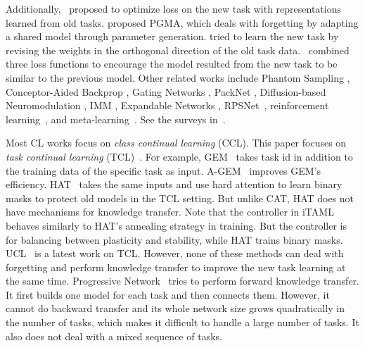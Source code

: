 \documentclass{article}
\begin{document}
Additionally,~\cite{Rosenfeld2017incremental} proposed to optimize loss on the new task with representations learned from old tasks. \cite{hu2019overcoming} proposed PGMA, which deals with forgetting by adapting a shared model through parameter generation.  
\cite{zeng2019continuous} tried to learn the new task by revising the weights in the orthogonal direction of the old task data.~\cite{Dhar2019CVPR} combined three loss functions to encourage the model resulted from the new task to be similar to the previous model. Other related works include Phantom Sampling \citep{Venkatesan2017strategy}, Conceptor-Aided Backprop \citep{He2018overcoming}, Gating Networks \citep{Masse2018alleviating,Serra2018overcoming}, PackNet \citep{Mallya2017packnet}, Diffusion-based Neuromodulation \citep{Velez2017diffusion}, IMM \citep{Lee2017overcoming}, Expandable Networks \citep{yoon2018lifelong,li2019learn}, RPSNet~\citep{rajasegaran2019neurIPS}, reinforcement learning~\citep{Kaplanis2019,Rolnick2019}, and meta-learning~\citep{Javed2019}. See the surveys in~\citep{chen2018lifelong,Parisi2018continual}.





Most CL works focus on \textit{class continual learning} (CCL). This paper focuses on \textit{task continual learning} (TCL)~\citep{Fernando2017pathnet,Serra2018overcoming}.
For example, GEM~\citep{Lopez2017gradient} takes task id in addition to the training data of the specific task as input. A-GEM~\citep{Chaudhry2019ICLR} improves GEM's efficiency. HAT~\citep{Serra2018overcoming} takes the same inputs and use hard attention to learn binary masks to protect old models in the TCL setting. 
But unlike CAT, HAT does not have mechanisms for knowledge transfer. 
Note that the controller in iTAML~\citep{rajasegaran2020itaml} behaves similarly to HAT's annealing strategy in training. But the controller is for balancing between plasticity and stability, while HAT trains binary masks. {UCL~\citep{DBLP:conf/nips/AhnCLM19} is a latest work on TCL}. However, none of these methods can deal with forgetting and perform knowledge transfer to improve the new task learning at the same time. Progressive Network~\citep{DBLP:journals/corr/RusuRDSKKPH16} tries to perform forward knowledge transfer. It first builds one model for each task and then connects them. However, it cannot do backward transfer and its whole network size grows quadratically in the number of tasks, which makes it difficult to handle a large number of tasks. It also does not deal with a mixed sequence of tasks. 
\end{document}
